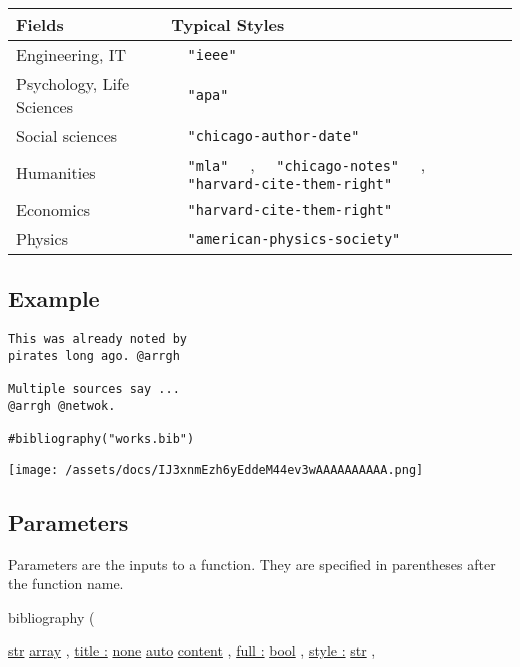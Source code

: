 \begin{longtable}[]{@{}ll@{}}
\toprule\noalign{}
Fields & Typical Styles \\
\midrule\noalign{}
\endhead
\bottomrule\noalign{}
\endlastfoot
Engineering, IT & \texttt{\ }{\texttt{\ "ieee"\ }}\texttt{\ } \\
Psychology, Life Sciences &
\texttt{\ }{\texttt{\ "apa"\ }}\texttt{\ } \\
Social sciences &
\texttt{\ }{\texttt{\ "chicago-author-date"\ }}\texttt{\ } \\
Humanities & \texttt{\ }{\texttt{\ "mla"\ }}\texttt{\ } ,
\texttt{\ }{\texttt{\ "chicago-notes"\ }}\texttt{\ } ,
\texttt{\ }{\texttt{\ "harvard-cite-them-right"\ }}\texttt{\ } \\
Economics &
\texttt{\ }{\texttt{\ "harvard-cite-them-right"\ }}\texttt{\ } \\
Physics &
\texttt{\ }{\texttt{\ "american-physics-society"\ }}\texttt{\ } \\
\end{longtable}

\subsection{Example}\label{example}

\begin{verbatim}
This was already noted by
pirates long ago. @arrgh

Multiple sources say ...
@arrgh @netwok.

#bibliography("works.bib")
\end{verbatim}

\texttt{[image: /assets/docs/IJ3xnmEzh6yEddeM44ev3wAAAAAAAAAA.png]}

\subsection{\texorpdfstring{{ Parameters
}}{ Parameters }}\label{parameters}

\label{parameters-tooltip}
Parameters are the inputs to a function. They are specified in
parentheses after the function name.

{ bibliography } (

{ \href{/docs/reference/foundations/str/}{str}
\href{/docs/reference/foundations/array/}{array} , } {
\hyperref[parameters-title]{title :}
\href{/docs/reference/foundations/none/}{none}
\href{/docs/reference/foundations/auto/}{auto}
\href{/docs/reference/foundations/content/}{content} , } {
\hyperref[parameters-full]{full :}
\href{/docs/reference/foundations/bool/}{bool} , } {
\hyperref[parameters-style]{style :}
\href{/docs/reference/foundations/str/}{str} , }

